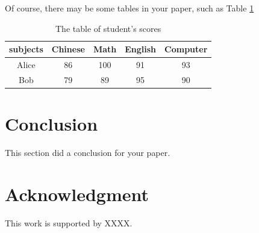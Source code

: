 \documentclass[twocolumn]{svjour3}          %
\begin{document}
Of course, there may be some tables in your paper, such as Table \ref{Table1}
\begin{table}
  \caption{The table of student's scores}
  \label{Table1}
  \begin{center}
    \begin{tabular}{ccccc}\hline
      subjects	&	Chinese	&	Math	&	English	&	Computer	\\ \hline
      Alice	&	86		&	100		&	91	&	93	\\
      Bob	&	79		&	89		&	95	&	90	\\ \hline
    \end{tabular}
  \end{center}
\end{table}
\section{Conclusion}
This section did a conclusion for your paper.

\section*{Acknowledgment}
This work is supported by XXXX.


\end{document}
